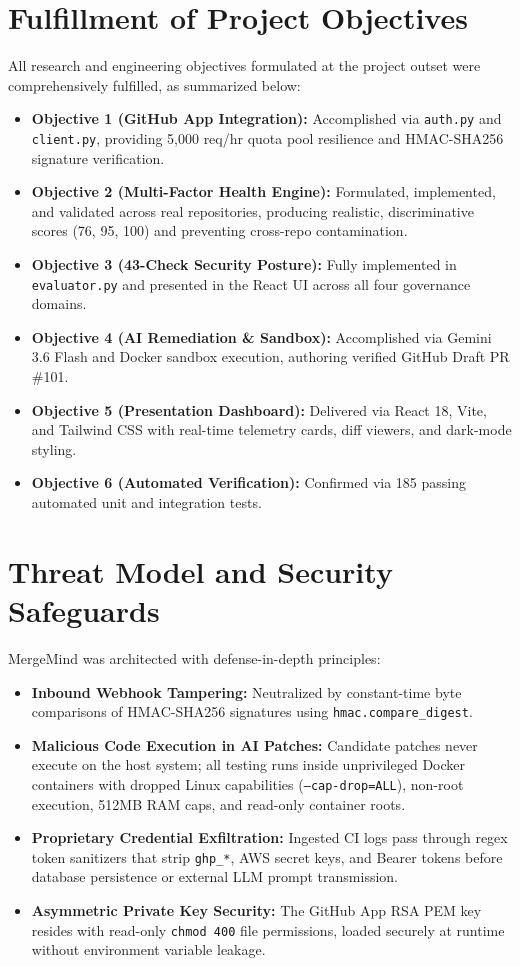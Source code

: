\documentclass[12pt,a4paper,oneside]{report}
\begin{document}
\section{Fulfillment of Project Objectives}
\label{sec:objective-fulfillment}

All research and engineering objectives formulated at the project outset were comprehensively fulfilled, as summarized below:
\begin{itemize}
    \item \textbf{Objective 1 (GitHub App Integration):} Accomplished via \texttt{auth.py} and \texttt{client.py}, providing 5,000 req/hr quota pool resilience and HMAC-SHA256 signature verification.
    \item \textbf{Objective 2 (Multi-Factor Health Engine):} Formulated, implemented, and validated across real repositories, producing realistic, discriminative scores (76, 95, 100) and preventing cross-repo contamination.
    \item \textbf{Objective 3 (43-Check Security Posture):} Fully implemented in \texttt{evaluator.py} and presented in the React UI across all four governance domains.
    \item \textbf{Objective 4 (AI Remediation \& Sandbox):} Accomplished via Gemini 3.6 Flash and Docker sandbox execution, authoring verified GitHub Draft PR \#101.
    \item \textbf{Objective 5 (Presentation Dashboard):} Delivered via React 18, Vite, and Tailwind CSS with real-time telemetry cards, diff viewers, and dark-mode styling.
    \item \textbf{Objective 6 (Automated Verification):} Confirmed via 185 passing automated unit and integration tests.
\end{itemize}

\section{Threat Model and Security Safeguards}
\label{sec:threat-model}

MergeMind was architected with defense-in-depth principles:
\begin{itemize}
    \item \textbf{Inbound Webhook Tampering:} Neutralized by constant-time byte comparisons of HMAC-SHA256 signatures using \texttt{hmac.compare\_digest}.
    \item \textbf{Malicious Code Execution in AI Patches:} Candidate patches never execute on the host system; all testing runs inside unprivileged Docker containers with dropped Linux capabilities (\texttt{--cap-drop=ALL}), non-root execution, 512MB RAM caps, and read-only container roots.
    \item \textbf{Proprietary Credential Exfiltration:} Ingested CI logs pass through regex token sanitizers that strip \texttt{ghp\_*}, AWS secret keys, and Bearer tokens before database persistence or external LLM prompt transmission.
    \item \textbf{Asymmetric Private Key Security:} The GitHub App RSA PEM key resides with read-only \texttt{chmod 400} file permissions, loaded securely at runtime without environment variable leakage.
\end{itemize}
\end{document}
